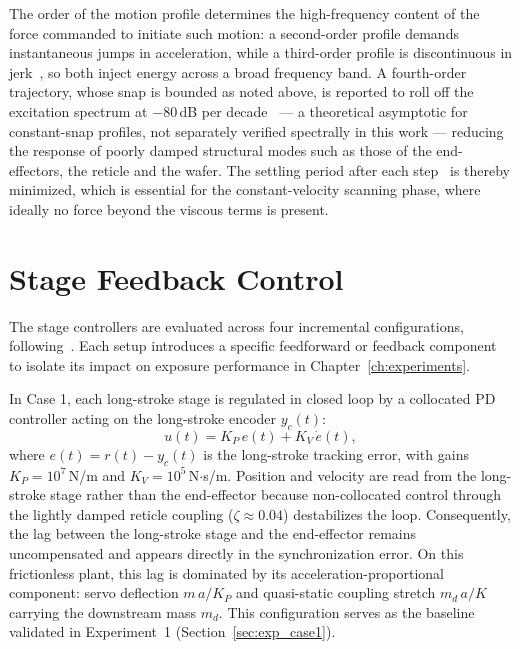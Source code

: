The order of the motion profile determines the high-frequency content of the force commanded to initiate such motion: a second-order profile demands instantaneous jumps in acceleration, while a third-order profile is discontinuous in jerk~\cite{Dong2023_SCurve}, so both inject energy across a broad frequency band. A fourth-order trajectory, whose snap is bounded as noted above, is reported to roll off the excitation spectrum at $-80$\,dB per decade~\cite{Lambrechts2003_Trajectories} --- a theoretical asymptotic for constant-snap profiles, not separately verified spectrally in this work --- reducing the response of poorly damped structural modes such as those of the end-effectors, the reticle and the wafer. The settling period after each step~\cite{Lambrechts2003_Trajectories, Al-Rawashdeh2023_Trajectories} is thereby minimized, which is essential for the constant-velocity scanning phase, where ideally no force beyond the viscous terms is present.

\section{Stage Feedback Control}\label{sec:methodology_control}

The stage controllers are evaluated across four incremental configurations, following~\cite{Al-Rawashdeh2022_Caracterization}. Each setup introduces a specific feedforward or feedback component to isolate its impact on exposure performance in Chapter~\ref{ch:experiments}.

In Case 1, each long-stroke stage is regulated in closed loop by a collocated PD controller acting on the long-stroke encoder $y_c(t)$:
\begin{equation}
    u(t) = K_P\, e(t) + K_V\, \dot{e}(t),
    \label{eq:case1_servo}
\end{equation}
where $e(t) = r(t) - y_c(t)$ is the long-stroke tracking error, with gains $K_P = 10^7$\,N/m and $K_V = 10^5$\,N$\cdot$s/m. Position and velocity are read from the long-stroke stage rather than the end-effector because non-collocated control through the lightly damped reticle coupling ($\zeta \approx 0.04$) destabilizes the loop. Consequently, the lag between the long-stroke stage and the end-effector remains uncompensated and appears directly in the synchronization error. On this frictionless plant, this lag is dominated by its acceleration-proportional component: servo deflection $m\,a/K_P$ and quasi-static coupling stretch $m_d\,a/K$ carrying the downstream mass $m_d$. This configuration serves as the baseline validated in Experiment~1 (Section~\ref{sec:exp_case1}).


